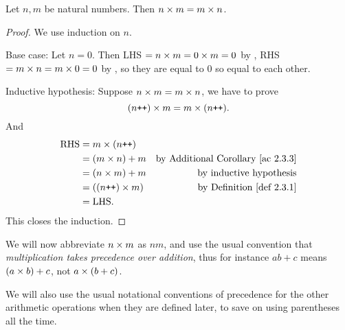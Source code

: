 \begin{lemma}\label{lem 2.3.2}
Let \(n, m\) be natural numbers. Then \(n \times m = m \times n\).
\end{lemma}
\begin{proof}
We use induction on \(n\).

Base case: Let \(n = 0\). Then LHS \(= n \times m = 0 \times m = 0\) by , RHS \(= m \times n = m \times 0 = 0\) by , so they are equal to \(0\) so equal to each other.

Inductive hypothesis: Suppose \(n \times m = m \times n\), we have to prove
\[(n\texttt{++}) \times m = m \times (n\texttt{++}).\]
And
\begin{align*}
    \text{RHS} & = m \X (n\INC) \\
               & = (m \X n) + m & \text{by \AC{2.3.3}} \\
               & = (n \X m) + m & \text{by inductive hypothesis} \\
               & = ((n\INC) \X m) & \text{by \DEF{2.3.1}} \\
               & = \text{LHS.}
\end{align*}
This closes the induction.
\end{proof}

\begin{note}
We will now abbreviate \(n \times m\) as \(nm\), and use the usual convention that \emph{multiplication takes precedence over addition}, thus for instance \(ab + c\) means \((a \times b)+ c\), not \(a \times (b + c)\).

We will also use the usual notational conventions of precedence for the other arithmetic operations when they are defined later, to save on using parentheses all the time.
\end{note}

